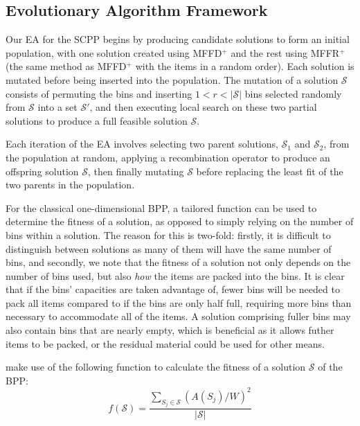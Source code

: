 \documentclass[authoryear]{elsarticle}
\begin{document}
\subsection{Evolutionary Algorithm Framework}
\label{sub:eaframework}
\noindent Our EA for the SCPP begins by producing candidate solutions to form an initial population, with one solution created using MFFD$^+$ and the rest using MFFR$^+$ (the same method as MFFD$^+$ with the items in a random order). Each solution is mutated before being inserted into the population. The mutation of a solution $\mathcal{S}$ consists of permuting the bins and inserting $1 < r < |\mathcal{S}|$ bins selected randomly from $\mathcal{S}$ into a set $\mathcal{S}'$, and then executing local search on these two partial solutions to produce a full feasible solution $\mathcal{S}$. 

Each iteration of the EA involves selecting two parent solutions, $\mathcal{S}_1$ and $\mathcal{S}_2$, from the population at random, applying a recombination operator to produce an offspring solution $\mathcal{S}$, then finally mutating $\mathcal{S}$ before replacing the least fit of the two parents in the population.

For the classical one-dimensional BPP, a tailored function can be used to determine the fitness of a solution, as opposed to simply relying on the number of bins within a solution. The reason for this is two-fold: firstly, it is difficult to distinguish between solutions as many of them will have the same number of bins, and secondly, we note that the fitness of a solution not only depends on the number of bins used, but also \emph{how} the items are packed into the bins. It is clear that if the bins' capacities are taken advantage of, fewer bins will be needed to pack all items compared to if the bins are only half full, requiring more bins than necessary to accommodate all of the items. A solution comprising fuller bins may also contain bins that are nearly empty, which is beneficial as it allows futher items to be packed, or the residual material could be used for other means.

\citet{falkenauer1992} make use of the following function to calculate the fitness of a solution $\mathcal{S}$ of the BPP:
\begin{equation}
f(\mathcal{S}) = \frac{\sum_{S_j \in \mathcal{S}} (A(S_j)/W)^2}{|\mathcal{S}|}
\label{eqn:fitness}
\end{equation}
\end{document}
